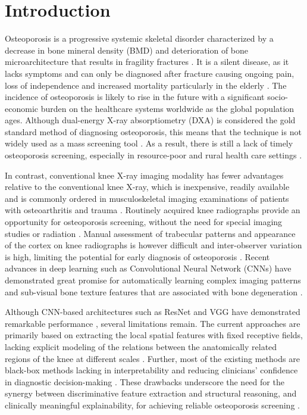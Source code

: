 \documentclass[conference]{IEEEtran}
\begin{document}
\section{Introduction} \label{Introduction}
Osteoporosis is a progressive systemic skeletal disorder characterized by a decrease in bone mineral density (BMD) and deterioration of bone microarchitecture that results in fragility fractures \cite{lorentzon2022osteoporosis}. It is a silent disease, as it lacks symptoms and can only be diagnosed after fracture causing ongoing pain, loss of independence and increased mortality particularly in the elderly \cite{salari2021global}. The incidence of osteoporosis is likely to rise in the future with a significant socio-economic burden on the healthcare systems worldwide as the global population ages. Although dual-energy X-ray absorptiometry (DXA) is considered the gold standard  method of diagnosing osteoporosis, this means that the technique is not widely used as a mass screening tool \cite{hui2025deep}. As a result, there is still a lack of timely osteoporosis screening, especially in resource-poor and rural health care settings \cite{auriat2026evaluating}.

In contrast, conventional knee X-ray imaging modality has fewer advantages relative to the conventional knee X-ray, which is inexpensive, readily available and is commonly ordered in musculoskeletal imaging examinations of patients with osteoarthritis and trauma \cite{wani2023osteoporosis}. Routinely acquired knee radiographs provide an opportunity for osteoporosis screening, without the need for special imaging studies or radiation \cite{hui2025deep}. Manual assessment of trabecular patterns and appearance of the cortex on knee radiographs is however difficult and inter-observer variation is high, limiting the potential for early diagnosis of osteoporosis \cite{wani2023osteoporosis}. Recent advances in deep learning such as Convolutional Neural Network (CNNs) have demonstrated great promise for automatically learning complex imaging patterns and sub-visual bone texture features that are associated with bone degeneration \cite{sukegawa2022identification,wani2023osteoporosis}.

Although CNN-based architectures such as ResNet and VGG have demonstrated remarkable performance \cite{wani2023osteoporosis}, several limitations remain. The current approaches are primarily based on extracting the local spatial features with fixed receptive fields, lacking explicit modeling of the relations between the anatomically related regions of the knee at different scales \cite{mienye2025graph}. Further, most of the existing methods are black-box methods lacking in interpretability and reducing clinicians' confidence in diagnostic decision-making \cite{salahuddin2022transparency}. These drawbacks underscore the need for the synergy between discriminative feature extraction and structural reasoning, and clinically meaningful explainability, for achieving reliable osteoporosis screening \cite{mienye2025graph,salahuddin2022transparency}.
\end{document}
